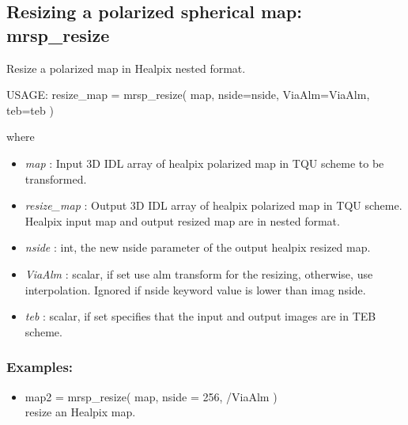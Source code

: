 \subsection{Resizing a polarized spherical map: mrsp\_resize}
Resize a polarized map in Healpix nested format.
{\bf
\begin{center}
     USAGE: resize\_map = mrsp\_resize( map, nside=nside, ViaAlm=ViaAlm, teb=teb )
\end{center}}
where
\begin{itemize}
\item {\em map} : Input 3D IDL array of healpix polarized map in TQU scheme to be transformed.
\item {\em resize\_map} : Output 3D IDL array of healpix polarized map in TQU scheme. Healpix input map and output resized map are in nested format.
\item {\em nside} : int, the new nside parameter of the output healpix resized map.
\item {\em ViaAlm} : scalar, if set use alm transform for the resizing, otherwise, use interpolation. 
Ignored if nside keyword value is lower than imag nside.
\item {\em teb} : scalar, if set specifies that the input and output images are in TEB scheme.
\end{itemize}

\subsubsection*{Examples:} 
\begin{itemize}
\item map2 = mrsp\_resize( map, nside = 256, /ViaAlm ) \\
resize an Healpix map.
\end{itemize}



